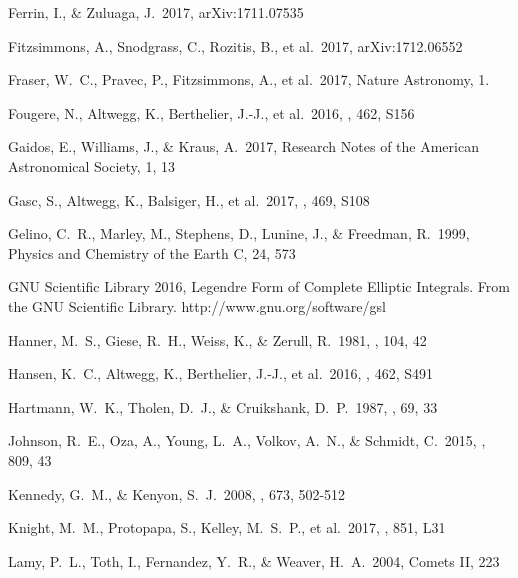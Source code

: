 \documentclass[a4paper,fleqn,usenatbib]{mnras}
\begin{document}
\begin{thebibliography}{99}
 Ferrin, I., \& Zuluaga, J.\ 2017, arXiv:1711.07535

 Fitzsimmons, A., Snodgrass, C., Rozitis, B., et al.\ 2017, arXiv:1712.06552

 Fraser, W.~C., Pravec, P., Fitzsimmons, A., et al.\ 2017, Nature Astronomy, 1.

 Fougere, N., Altwegg, K., Berthelier, J.-J., et al.\ 2016, \mnras, 462, S156 

 Gaidos, E., Williams, J., \& Kraus, A.\ 2017, Research Notes of the American Astronomical Society, 1, 13

 Gasc, S., Altwegg, K., Balsiger, H., et al.\ 2017, \mnras, 469, S108 

 Gelino, C.~R., Marley, M., Stephens, D., Lunine, J., \& Freedman, R.\ 1999, Physics and Chemistry of the Earth C, 24, 573 

 GNU Scientific Library 2016, Legendre Form of Complete Elliptic Integrals. From the GNU Scientific Library. http://www.gnu.org/software/gsl

 Hanner, M.~S., Giese, R.~H., Weiss, K., \& Zerull, R.\ 1981, \aap, 104, 42 

 Hansen, K.~C., Altwegg, K., Berthelier, J.-J., et al.\ 2016, \mnras, 462, S491 

 Hartmann, W.~K., Tholen, D.~J., \& Cruikshank, D.~P.\ 1987, \icarus, 69, 33 

 Johnson, R.~E., Oza, A., Young, L.~A., Volkov, A.~N., \& Schmidt, C.\ 2015, \apj, 809, 43 

 Kennedy, G.~M., \& Kenyon, S.~J.\ 2008, \apj, 673, 502-512 

 Knight, M.~M., Protopapa, S., Kelley, M.~S.~P., et al.\ 2017, \apjl, 851, L31 

 Lamy, P.~L., Toth, I., Fernandez, Y.~R., \& Weaver, H.~A.\ 2004, Comets II, 223 


\end{thebibliography}
\end{document}
